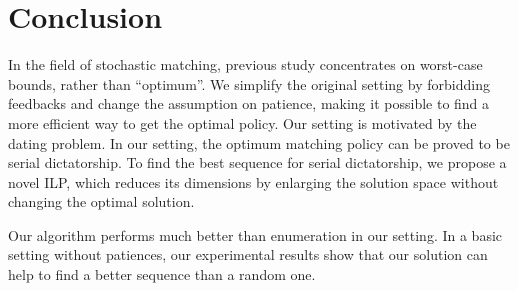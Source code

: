 \documentclass[letterpaper]{article}
\begin{document}
\section{Conclusion}
In the field of stochastic matching, previous study concentrates on worst-case bounds, rather than ``optimum''.
We simplify the original setting by forbidding feedbacks and change the assumption on patience, making it possible to find a more efficient way to get the optimal policy.
Our setting is motivated by the dating problem.
In our setting, the optimum matching policy can be proved to be serial dictatorship.
To find the best sequence for serial dictatorship, we propose a novel ILP, which reduces its dimensions by enlarging the solution space without changing the optimal solution.
 
Our algorithm performs much better than enumeration in our setting.
In a basic setting without patiences, our experimental results show that our solution can help to find a better sequence than a random one. 

\newpage


\end{document}
